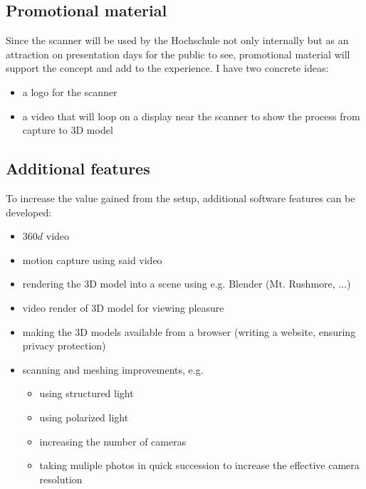 \subsection{Promotional material}	
	Since the scanner will be used by the Hochschule not only internally but as an attraction on presentation days for the public to see, promotional material will support the concept and add to the experience. I have two concrete ideas:
	\begin{itemize}
		\item a logo for the scanner
		\item a video that will loop on a display near the scanner to show the process from capture to 3D model
	\end{itemize}

\subsection{Additional features}
	To increase the value gained from the setup, additional software features can be developed:
	\begin{itemize}
		\item $360d$ video
		\item motion capture using said video
		\item rendering the 3D model into a scene using e.g. Blender (Mt. Rushmore, ...)
		\item video render of 3D model for viewing pleasure
		\item making the 3D models available from a browser (writing a website, ensuring		 privacy protection)
		\item scanning and meshing improvements, e.g.
			\begin{itemize}
				\item using structured light \cite{meshroom_structlight}
				\item using polarized light
				\item increasing the number of cameras
				\item taking muliple photos in quick succession to increase the effective camera resolution
			\end{itemize}
	\end{itemize}